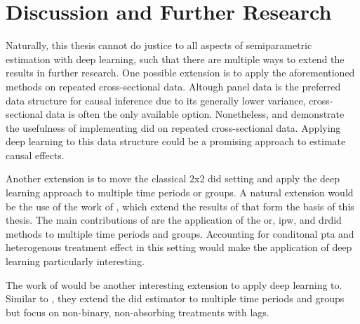 \section{Discussion and Further Research}

Naturally, this thesis cannot do justice to all aspects of semiparametric estimation with deep learning, such that there are multiple ways to extend the results in further research.
One possible extension is to apply the aforementioned methods on repeated cross-sectional data.
Altough panel data is the preferred data structure for causal inference due to its generally lower variance, cross-sectional data is often the only available option.
Nonetheless, \citet{santannaDoublyRobustDifferenceindifferences2020} and \citet{manfeDifferenceInDifferenceDesignRepeated} demonstrate the usefulness of implementing \ac{did} on repeated cross-sectional data.
Applying deep learning to this data structure could be a promising approach to estimate causal effects.

Another extension is to move the classical 2x2 \ac{did} setting and apply the deep learning approach to multiple time periods or groups.
A natural extension would be the use of the work of \citet{callawayDifferenceinDifferencesMultipleTime2021}, which extend the results of \citet{santannaDoublyRobustDifferenceindifferences2020} that form the basis of this thesis.
The main contributions of  \citet{callawayDifferenceinDifferencesMultipleTime2021} are the application of the \ac{or}, \ac{ipw}, and \ac{drdid} methods to multiple time periods and groups.
Accounting for conditonal \ac{pta} and heterogenous treatment effect in this setting would make the application of deep learning particularly interesting.

The work of \citet{dechaisemartinDifferenceinDifferencesEstimatorsIntertemporal2024} would be another interesting extension to apply deep learning to.
Similar to \citet{callawayDifferenceinDifferencesMultipleTime2021}, they extend the \ac{did} estimator to multiple time periods and groups but focus on non-binary, non-absorbing treatments with lags.

